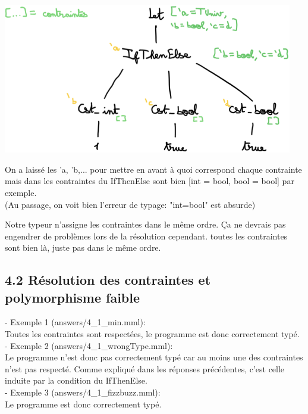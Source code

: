 \documentclass{article}
\begin{document}
{
  \includegraphics[width=0.95\textwidth,height=\textheight,keepaspectratio]
  {./assets/4_1_contraintes.png} 
}
{
  On a laissé les 'a, 'b,... pour mettre en avant à quoi correspond chaque contrainte mais dans les contraintes du IfThenElse sont bien [int = bool, bool = bool] par exemple.\\
  (Au passage, on voit bien l'erreur de typage: "int=bool" est absurde)

}

{
  Notre typeur n'assigne les contraintes dans le même ordre. Ça ne 
  devrais pas engendrer de problèmes lors de la résolution cependant. toutes les
  contraintes sont bien là, juste pas dans le même ordre.
}
{}

\subsection{4.2 Résolution des contraintes et polymorphisme faible}

{
  - Exemple 1 (answers/4\_1\_min.mml):\\
  Toutes les contraintes sont respectées, le programme est donc correctement typé.\\
  - Exemple 2 (answers/4\_1\_wrongType.mml):\\
  Le programme n'est donc pas correctement typé car au moins une des contraintes n'est pas respecté. Comme expliqué dans les réponses précédentes, c'est celle induite par la condition du IfThenElse.\\
  - Exemple 3 (answers/4\_1\_fizzbuzz.mml):\\
  Le programme est donc correctement typé.\\

}
{}
\end{document}
